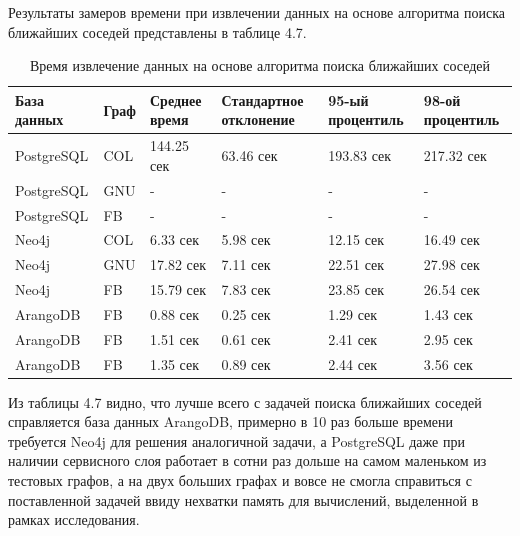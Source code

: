 Результаты замеров времени при извлечении данных на основе алгоритма поиска ближайших соседей представлены в таблице 4.7.

\begin{table} [htbp]
    \centering\small
    \caption{Время извлечение данных на основе алгоритма поиска ближайших соседей}
    \begin{tabular}{|p{3cm}|p{1cm}|p{2cm}|p{2cm}|p{2cm}|p{2cm}|}
        \hline
        База данных & Граф & Среднее время & Стандартное отклонение & 95-ый процентиль & 98-ой процентиль \\ \hline
        PostgreSQL  & COL  & 144.25 сек    & 63.46 сек              & 193.83 сек       & 217.32 сек       \\ \hline
        PostgreSQL  & GNU  & -             & -                      & -                & -                \\ \hline
        PostgreSQL  & FB   & -             & -                      & -                & -                \\ \hline
        Neo4j       & COL  & 6.33 сек      & 5.98 сек               & 12.15 сек        & 16.49 сек        \\ \hline
        Neo4j       & GNU  & 17.82 сек     & 7.11 сек               & 22.51 сек        & 27.98 сек        \\ \hline
        Neo4j       & FB   & 15.79 сек     & 7.83 сек               & 23.85 сек        & 26.54 сек        \\ \hline
        ArangoDB    & FB   & 0.88 сек      & 0.25 сек               & 1.29 сек         & 1.43 сек         \\ \hline
        ArangoDB    & FB   & 1.51 сек      & 0.61 сек               & 2.41 сек         & 2.95 сек         \\ \hline
        ArangoDB    & FB   & 1.35 сек      & 0.89 сек               & 2.44 сек         & 3.56 сек         \\ \hline
    \end{tabular}
    \normalsize
\end{table}

Из таблицы 4.7 видно, что лучше всего с задачей поиска ближайших соседей справляется база данных ArangoDB, примерно в 10 раз больше времени
требуется Neo4j для решения аналогичной задачи, а PostgreSQL даже при наличии сервисного слоя работает в сотни раз дольше на самом маленьком
из тестовых графов, а на двух больших графах и вовсе не смогла справиться с поставленной задачей ввиду нехватки память для вычислений,
выделенной в рамках исследования.



